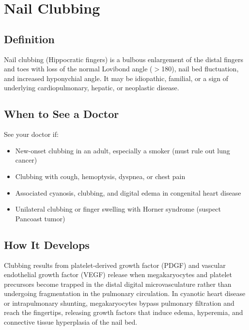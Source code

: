 \chapter{Nail Clubbing}

\section*{Definition}
Nail clubbing (Hippocratic fingers) is a bulbous enlargement of the distal fingers and toes with loss of the normal Lovibond angle (\ensuremath{>}180\textdegree{}), nail bed fluctuation, and increased hyponychial angle. It may be idiopathic, familial, or a sign of underlying cardiopulmonary, hepatic, or neoplastic disease.

\section*{When to See a Doctor}
See your doctor if:
\begin{itemize}
  \item New-onset clubbing in an adult, especially a smoker (must rule out lung cancer)
  \item Clubbing with cough, hemoptysis, dyspnea, or chest pain
  \item Associated cyanosis, clubbing, and digital edema in congenital heart disease
  \item Unilateral clubbing or finger swelling with Horner syndrome (suspect Pancoast tumor)
\end{itemize}

\section*{How It Develops}
Clubbing results from platelet-derived growth factor (PDGF) and vascular endothelial growth factor (VEGF) release when megakaryocytes and platelet precursors become trapped in the distal digital microvasculature rather than undergoing fragmentation in the pulmonary circulation. In cyanotic heart disease or intrapulmonary shunting, megakaryocytes bypass pulmonary filtration and reach the fingertips, releasing growth factors that induce edema, hyperemia, and connective tissue hyperplasia of the nail bed.

